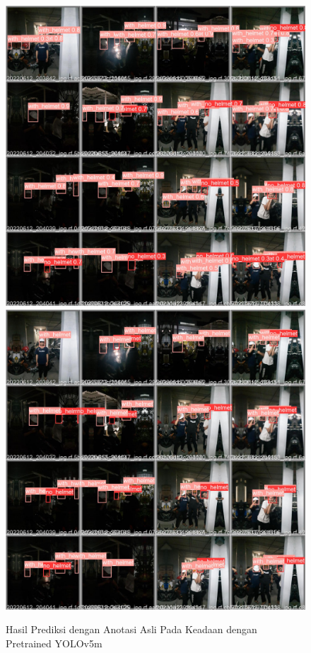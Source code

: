 \begin{figure}[ht]
  \centering
  \includegraphics[scale=0.1]{gambar/train_v2_val/low_ligjt/yolomedium/val_batch0_pred.jpg}
  \includegraphics[scale=0.1]{gambar/train_v2_val/low_ligjt/yolomedium/val_batch0_labels.jpg}
  \caption{Hasil Prediksi dengan Anotasi Asli Pada Keadaan dengan Pretrained YOLOv5m}
\end{figure}

